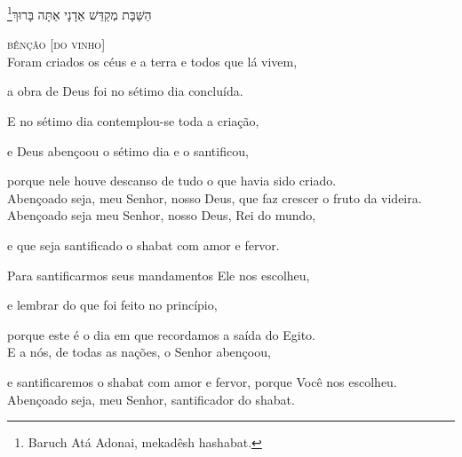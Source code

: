 \footnote{Baruch Atá Adonai, mekadêsh hashabat.}הַשַּׁבָּת מְקַדֵּשׁ אַדָנָי אַתָּה בָּרוּךְ

\movetooddpage
\raggedright

\vspace*{1cm}

\textsc{bênção [do vinho]}\\[15pt]

Foram criados os céus e a terra e todos que lá vivem,

a obra de Deus foi no sétimo dia concluída.

E no sétimo dia contemplou-se toda a criação,

e Deus abençoou o sétimo dia e o santificou,

porque nele houve descanso de tudo o que havia sido criado.\\[10pt]

Abençoado seja, meu Senhor, nosso Deus, que faz crescer o fruto da
videira.\\[10pt]

Abençoado seja meu Senhor, nosso Deus, Rei do mundo,

e que seja santificado o shabat com amor e fervor.

Para santificarmos seus mandamentos Ele nos escolheu,

e lembrar do que foi feito no princípio,

porque este é o dia em que recordamos a saída do Egito.\\[10pt]

E a nós, de todas as nações, o Senhor abençoou,

e santificaremos o shabat com amor e fervor, porque Você nos escolheu.\\[10pt]


Abençoado seja, meu Senhor, santificador do shabat.











\endgroup

